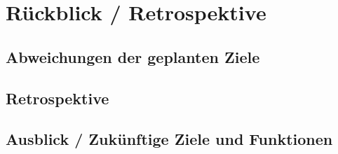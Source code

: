 \section{Rückblick / Retrospektive}\label{sec:rueckblick-retrospektive}

\subsection{Abweichungen der geplanten Ziele}\label{subsec:abweichungen-der-geplanten-ziele}

\subsection{Retrospektive}\label{subsec:Retrospektive}

\subsection{Ausblick / Zukünftige Ziele und Funktionen}\label{subsec:ausblick-zukuenftige-ziele-und-funktionen}